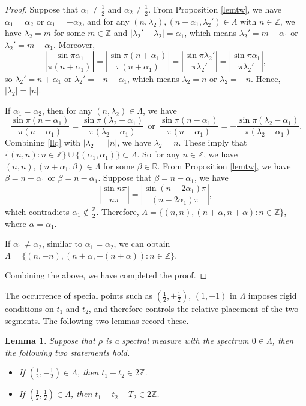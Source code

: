 \documentclass[12pt,a4paper,intlimits,sumlimits]{amsart}
\theoremstyle{plain}
\newtheorem{lemma}{Lemma}
\theoremstyle{definition}
\newcommand{\Abs}[1]{{\left|{#1}\right|}}
\newcommand{\RR}{{\mathbb R}}
\newcommand{\ZZ}{{\mathbb Z}}
\newcounter{rem}
\begin{document}
\begin{proof}
Suppose that $\alpha_1\neq\frac{1}{2}$ and $\alpha_2\neq\frac{1}{2}$. From Proposition \ref{lemtw}, we have $\alpha_1=\alpha_2$ or $\alpha_1=-\alpha_2$, and for any $(n, \lambda_2), (n+\alpha_1, \lambda_2')\in\Lambda$ with   $n\in\ZZ$, we have $\lambda_2=m$ for some $m\in\ZZ$ and $|\lambda_2'-\lambda_2|=\alpha_1$, which means $\lambda_2'=m+\alpha_1$ or $\lambda_2'=m-\alpha_1$. Moreover, 
 $$
 \Abs{\frac{\sin \pi  \alpha_1  }{  \pi  (n+\alpha_1)}} =  \Abs{\frac{\sin \pi (n+\alpha_1) }{  \pi  (n+\alpha_1)}} = \Abs{\frac{\sin \pi \lambda_2'  }{ \pi\lambda_2'}} = \Abs{\frac{\sin \pi  \alpha_1  }{ \pi\lambda_2'}},$$
so $\lambda_2'=n+\alpha_1$ or $\lambda_2'=-n-\alpha_1$, which means $\lambda_2=n$ or $\lambda_2=-n$. Hence, $|\lambda_2|=|n|$.

If $\alpha_1=\alpha_2$, then for any $(n, \lambda_2)\in\Lambda$, we have 
\begin{equation}\label{llq}\frac{\sin \pi (n-\alpha_1 )}{  \pi    (n-\alpha_1 ) }  =  \frac{\sin \pi (\lambda_2-\alpha_1 ) }{  \pi  (\lambda_2-\alpha_1)}\ \ \text{or} \ \ \frac{\sin \pi (n-\alpha_1 )}{  \pi    (n-\alpha_1 ) }  = - \frac{\sin \pi (\lambda_2-\alpha_1 ) }{  \pi  (\lambda_2-\alpha_1)}.\end{equation}
 Combining \eqref{llq} with $|\lambda_2|=|n|$, we have $\lambda_2=n$.
These imply that $\{(n, n): n\in\ZZ\}\cup\{(\alpha_1, \alpha_1)\}\subset\Lambda$. So  for any $n\in\ZZ $, we have $(n, n), (n+\alpha_1 , \beta) \in\Lambda$ for some  $\beta\in\RR$. From Proposition \ref{lemtw}, we have $ \beta= n+\alpha_1$  or $\beta=n-\alpha_1$. Suppose that $\beta=n-\alpha_1$, we have 
$$
 \Abs{\frac{\sin n\pi  }{  n\pi   }} =  \Abs{\frac{\sin (n-2\alpha_1)\pi  }{ (n-2\alpha_1) \pi  }},$$
 which contradicts $\alpha_1\notin\frac{\ZZ}{2}$. Therefore, $ \Lambda= \{(n, n ), (n+\alpha,n+\alpha): n\in \mathbb{Z}\}$, where $\alpha=\alpha_1$.

If  $\alpha_1\neq\alpha_2$,  similar to $\alpha_1=\alpha_2$,  we can obtain  $ \Lambda= \{(n, -n ), (n+\alpha, -(n+\alpha)): n\in \mathbb{Z}\}$.

Combining the above, we have completed the  proof.

\end{proof} 
 The occurrence of special points such as 
  $(\frac{1}{2}, \pm\frac{1}{2})$,   $(1, \pm 1)$ in $\Lambda$
  imposes rigid conditions on $t_1$ and $t_2$, and therefore controls the relative placement of the two segments. The following two lemmas record  these. 
\begin{lemma}\label{lemtwo}
Suppose that $\rho $ is a spectral measure with the spectrum $0\in\Lambda$, then the following two statements hold.
\begin{itemize}
\item[(I)] 
If $(\frac{1}{2}, -\frac{1}{2})\in\Lambda$, then $t_1+t_2\in 2\mathbb{Z}$.
\item[(II)]
 If $(\frac{1}{2}, \frac{1}{2})\in\Lambda$, then $t_1-t_2-T_2\in 2\mathbb{Z}$.
 \end{itemize}
\end{lemma}
\end{document}
